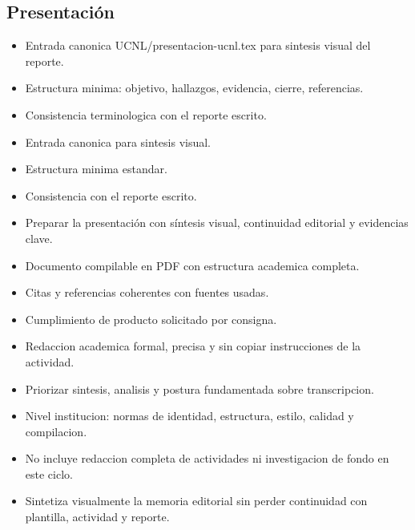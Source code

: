 \documentclass[12pt]{article}
\begin{document}
\subsection*{Presentación}
\begin{itemize}[leftmargin=*]
  \item Entrada canonica UCNL/presentacion-ucnl.tex para sintesis visual del reporte.
  \item Estructura minima: objetivo, hallazgos, evidencia, cierre, referencias.
  \item Consistencia terminologica con el reporte escrito.
  \item Entrada canonica para sintesis visual.
  \item Estructura minima estandar.
  \item Consistencia con el reporte escrito.
  \item Preparar la presentación con síntesis visual, continuidad editorial y evidencias clave.
  \item Documento compilable en PDF con estructura academica completa.
  \item Citas y referencias coherentes con fuentes usadas.
  \item Cumplimiento de producto solicitado por consigna.
  \item Redaccion academica formal, precisa y sin copiar instrucciones de la actividad.
  \item Priorizar sintesis, analisis y postura fundamentada sobre transcripcion.
  \item Nivel institucion: normas de identidad, estructura, estilo, calidad y compilacion.
  \item No incluye redaccion completa de actividades ni investigacion de fondo en este ciclo.
  \item Sintetiza visualmente la memoria editorial sin perder continuidad con plantilla, actividad y reporte.
\end{itemize}
\end{document}
